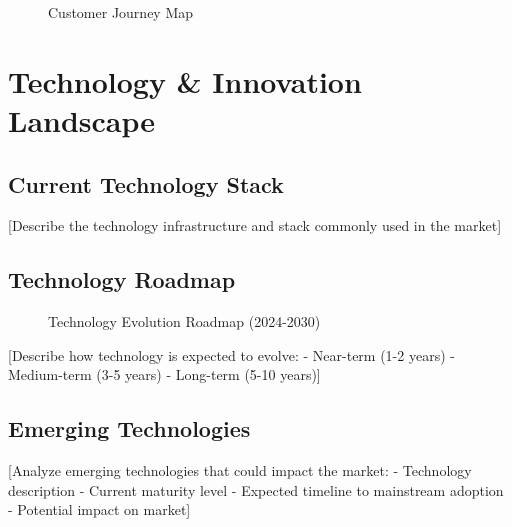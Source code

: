 \documentclass[11pt,letterpaper]{report}
\begin{document}
\begin{figure}[htbp]
\centering
\caption{Customer Journey Map}
\label{fig:customer_journey}
\end{figure}

\chapter{Technology \& Innovation Landscape}

\section{Current Technology Stack}

[Describe the technology infrastructure and stack commonly used in the market]

\section{Technology Roadmap}


\begin{figure}[htbp]
\centering
\caption{Technology Evolution Roadmap (2024-2030)}
\label{fig:tech_roadmap}
\end{figure}

[Describe how technology is expected to evolve:
- Near-term (1-2 years)
- Medium-term (3-5 years)
- Long-term (5-10 years)]

\section{Emerging Technologies}

[Analyze emerging technologies that could impact the market:
- Technology description
- Current maturity level
- Expected timeline to mainstream adoption
- Potential impact on market]
\end{document}
